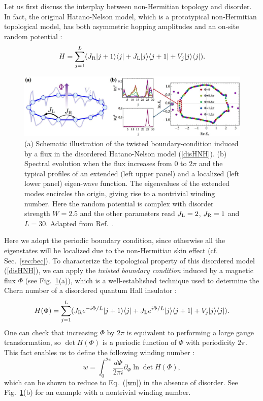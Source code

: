 \documentclass{tADP2e}
\theoremstyle{plain}
\theoremstyle{plain}
\theoremstyle{definition}
\begin{document}
\vspace{3pt}
\noindent
Let us first discuss the interplay between non-Hermitian topology and disorder. In fact, the original Hatano-Nelson model, which is a prototypical non-Hermitian topological model, has both asymmetric hopping amplitudes and an on-site random potential \cite{HN96}:
\begin{equation}
H=\sum^L_{j=1} (J_{\rm R}|j+1\rangle\langle j| + J_{\rm L}|j\rangle\langle j+1|+V_j|j\rangle\langle j|).
\label{disHNH}
\end{equation}  
\begin{figure}[!t]
\begin{center}
\includegraphics[width=14cm]{./Figures/fig_6_flux.pdf}
\end{center}
\caption{(a) Schematic illustration of the twisted boundary-condition induced by a flux in the disordered Hatano-Nelson model (\ref{disHNH}). (b) Spectral evolution when the flux increases from $0$ to $2\pi$ and the typical profiles of an extended (left upper panel) and a localized (left lower panel) eigen-wave function. The eigenvalues of the extended modes encircles the origin, giving rise to a nontrivial winding number. Here the random potential is complex with disorder strength $W=2.5$ and the other parameters read $J_{\rm L}=2$, $J_{\rm R}=1$ and $L=30$. Adapted from Ref.~\cite{ZG18}.}
\label{fig:flux}
\end{figure}
\noindent Here we adopt the periodic boundary condition, since otherwise all the eigenstates will be localized due to the non-Hermitian skin effect (cf. Sec.~\ref{sec:bec}). To characterize the topological property of this disordered model (\ref{disHNH}), we can apply the \emph{twisted boundary condition} induced by a magnetic flux $\Phi$ (see Fig.~\ref{fig:flux}(a)), which is a well-established technique used to determine the Chern number of a disordered quantum Hall insulator \cite{NQ85}:
\begin{equation}
H(\Phi)=\sum^L_{j=1} (J_{\rm R}e^{-i\Phi/L}|j+1\rangle\langle j| + J_{\rm L}e^{i\Phi/L}|j\rangle\langle j+1|+V_j|j\rangle\langle j|).
\label{HPhi}
\end{equation}  
One can check that increasing $\Phi$ by $2\pi$ is equivalent to performing a large gauge transformation, so $\det H(\Phi)$ is a periodic function of $\Phi$ with periodicity $2\pi$. This fact enables us to define the following winding number \cite{ZG18}:
\begin{equation}
w=\int^{2\pi}_0 \frac{d\Phi}{2\pi i}\partial_\Phi\ln\det H(\Phi),
\label{fluxwn}
\end{equation}
which can be shown to reduce to Eq.~(\ref{wn}) in the absence of disorder. See Fig.~\ref{fig:flux}(b) for an example with a nontrivial winding number. 
\end{document}
